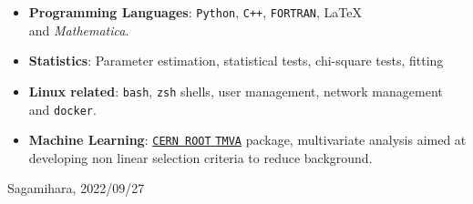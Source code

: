 \documentclass[a4paper]{article}
\begin{document}
\begin{itemize}
	\item \textbf{Programming Languages}: \texttt{Python}, \texttt{C++}, \texttt{FORTRAN}, \LaTeX \\  and \textit{Mathematica}.
  \item \textbf{Statistics}: Parameter estimation, statistical tests, chi-square
    tests, fitting
  \item \textbf{Linux related}: \texttt{bash}, \texttt{zsh} shells, user
    management, network management and \texttt{docker}.
  \item \textbf{Machine Learning}: \href{https://root.cern/manual/tmva/}{\texttt{CERN ROOT} \texttt{TMVA}} package,
    multivariate analysis aimed at developing non linear selection criteria to
    reduce background.
  \end{itemize}
\vspace{2\baselineskip}
\noindent Sagamihara, 2022/09/27
\end{document}
